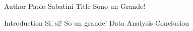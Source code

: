 Author Paolo Sabatini 
Title	Sono un Grande!
	
Introduction	Si, si! So un grande!
Data
Analysis
Conclusion
